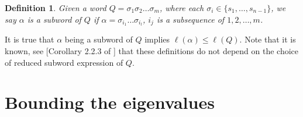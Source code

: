 \documentclass[11pt]{article}
\theoremstyle{plain}  %
\newtheorem{lemma}[theorem]{Lemma}
\newtheorem{definition}[theorem]{Definition}
\begin{document}
\begin{definition}\label{def:subword}
Given a word $Q = \sigma_1 \sigma_2 \ldots \sigma_m$, where each $\sigma_i \in \{s_1,\ldots,s_{n-1}\}$, we say $\alpha$ is a subword of $Q$ if $\alpha = \sigma_{i_1}\ldots \sigma_{i_l}$, $i_j$ is a subsequence of $1,2,\ldots,m$.
\end{definition}
It is true that $\alpha$ being a subword of $Q$ implies $\ell(\alpha) \le \ell(Q)$. Note that it is known, see [Corollary 2.2.3 of \cite{bjorner2005combinatorics}] that these definitions do not depend on the choice of reduced subword expression of $Q$.








\section{Bounding the eigenvalues} \label{sec:boundeigen}  
\end{document}
